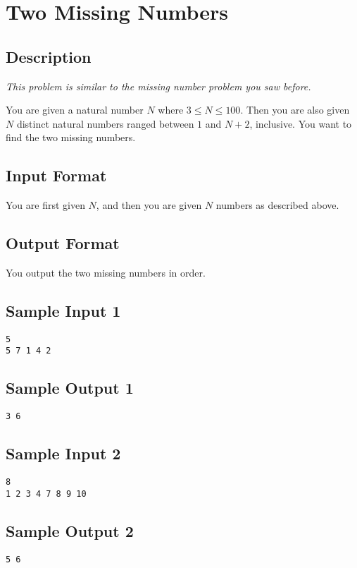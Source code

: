 

\section{Two Missing Numbers}
\subsection*{Description}
\textit{This problem is similar to the missing number problem you saw before.}

You are given a natural number $N$ where $3 \leq N \leq 100$. 
Then you are also given $N$ distinct natural numbers ranged between $1$ and $N+2$, inclusive.  You want to find the two missing numbers. 

\subsection*{Input Format}
You are first given $N$, and then you are given $N$ numbers as described above. 

\subsection*{Output Format}
You output the two missing numbers in order. 

\subsection*{Sample Input 1}
\begin{verbatim}
5
5 7 1 4 2
\end{verbatim}
\subsection*{Sample Output 1}
\begin{verbatim}
3 6
\end{verbatim}

\subsection*{Sample Input 2}
\begin{verbatim}
8
1 2 3 4 7 8 9 10
\end{verbatim}
\subsection*{Sample Output 2}
\begin{verbatim}
5 6
\end{verbatim}




